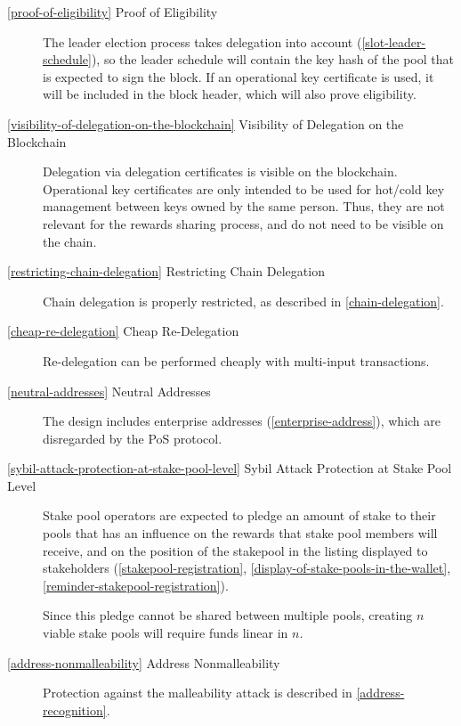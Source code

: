 \documentclass[11pt,a4paper]{article}
\begin{document}
\begin{description}

\item[\cref{proof-of-eligibility} Proof of Eligibility] The leader
  election process takes delegation into account
  (\cref{slot-leader-schedule}), so the leader schedule will contain
  the key hash of the pool that is expected to sign the block. If an
  operational key certificate is used, it will be included in the block
  header, which will also prove eligibility.

\item[\cref{visibility-of-delegation-on-the-blockchain} Visibility of
  Delegation on the Blockchain] Delegation via delegation certificates
  is visible on the blockchain. Operational key certificates are only
  intended to be used for hot/cold key management between keys owned
  by the same person. Thus, they are not relevant for the rewards
  sharing process, and do not need to be visible on the chain.

\item[\cref{restricting-chain-delegation} Restricting Chain
  Delegation] Chain delegation is properly restricted, as described in
  \cref{chain-delegation}.

\item[\cref{cheap-re-delegation} Cheap Re-Delegation] Re-delegation can
  be performed cheaply with multi-input transactions.

\item[\cref{neutral-addresses} Neutral Addresses] The design includes
  enterprise addresses (\cref{enterprise-address}), which are
  disregarded by the PoS protocol.

\item[\cref{sybil-attack-protection-at-stake-pool-level} Sybil Attack
  Protection at Stake Pool Level] Stake pool operators are expected to
  pledge an amount of stake to their pools that has an influence on
  the rewards that stake pool members will receive, and on the
  position of the stakepool in the listing displayed to stakeholders
  (\cref{stakepool-registration},
  \cref{display-of-stake-pools-in-the-wallet},
  \cref{reminder-stakepool-registration}).

  Since this pledge cannot be shared between multiple pools, creating
  $n$ viable stake pools will require funds linear in $n$.

\item[\cref{address-nonmalleability} Address Nonmalleability]
  Protection against the malleability attack is described in
  \cref{address-recognition}.


\end{description}
\end{document}
